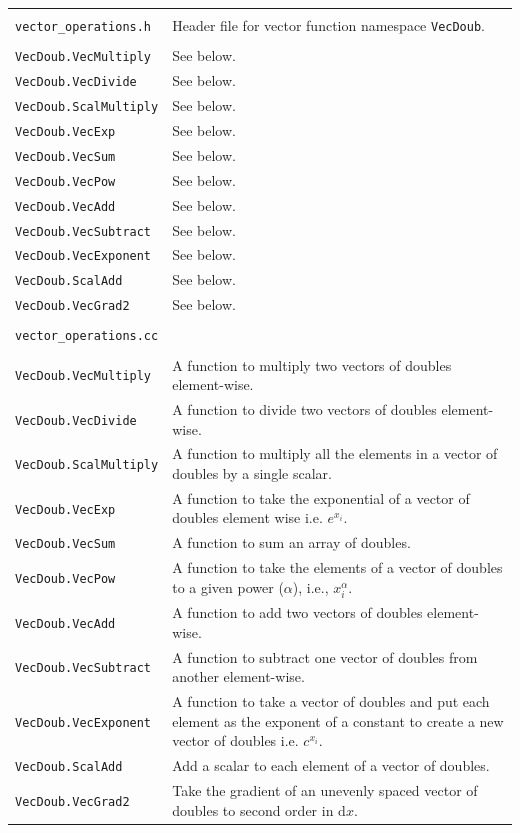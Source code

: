 \documentclass[11pt, oneside]{article}   	%
\begin{document}
\begin{longtable}{l p{10cm}}
\multicolumn{2}{l}{} \\
\texttt{vector\_operations.h} & Header file for vector function namespace \texttt{VecDoub}. \\
\hline \\
\texttt{VecDoub.VecMultiply} & See below. \\
\texttt{VecDoub.VecDivide} & See below. \\
\texttt{VecDoub.ScalMultiply} & See below. \\
\texttt{VecDoub.VecExp} & See below. \\
\texttt{VecDoub.VecSum} & See below. \\
\texttt{VecDoub.VecPow} & See below. \\
\texttt{VecDoub.VecAdd} & See below. \\
\texttt{VecDoub.VecSubtract} & See below. \\
\texttt{VecDoub.VecExponent} & See below. \\
\texttt{VecDoub.ScalAdd} & See below. \\
\texttt{VecDoub.VecGrad2} & See below. \\

\multicolumn{2}{l}{} \\
\multicolumn{2}{l}{\texttt{vector\_operations.cc}} \\
\hline \\
\texttt{VecDoub.VecMultiply} & A function to multiply two vectors of doubles element-wise.\\
\texttt{VecDoub.VecDivide} & A function to divide two vectors of doubles element-wise. \\
\texttt{VecDoub.ScalMultiply} & A function to multiply all the elements in a vector of doubles by a single scalar. \\
\texttt{VecDoub.VecExp} & A function to take the exponential of a vector of doubles element wise i.e. $e^{x_i}$. \\
\texttt{VecDoub.VecSum} & A function to sum an array of doubles. \\
\texttt{VecDoub.VecPow} & A function to take the elements of a vector of doubles to a given power ($\alpha$), i.e., $x_i^{\alpha}$. \\
\texttt{VecDoub.VecAdd} & A function to add two vectors of doubles element-wise.\\
\texttt{VecDoub.VecSubtract} & A function to subtract one vector of doubles from another element-wise.  \\
\texttt{VecDoub.VecExponent} & A function to take a vector of doubles and put each element as the exponent of a constant to create a new vector of doubles i.e. $c^{x_i}$. \\
\texttt{VecDoub.ScalAdd} & Add a scalar to each element of a vector of doubles. \\
\texttt{VecDoub.VecGrad2} & Take the gradient of an unevenly spaced vector of doubles to second order in $\mathrm{d}x$. \\


\end{longtable}
\vspace{0.5 cm}
\end{document}
